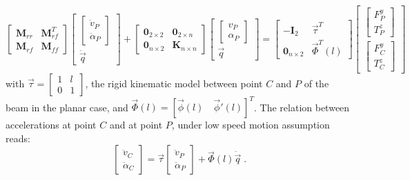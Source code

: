 \documentclass[smallcondensed]{svjour3}     %
\begin{document}
\begin{equation}\label{eq:2nd}
\left[\begin{array}{cc}\mathbf{M}_{rr} & \mathbf{M}_{rf}^T \\\mathbf{M}_{rf} & \mathbf{M}_{ff} \end{array}\right]\left[\begin{array}{c}\left[\begin{array}{c}\ddot{v}_P\\\ddot{\alpha}_P\end{array}\right] \\ \ddot{\vec{q}} \end{array}\right]+\left[\begin{array}{cc}\mathbf{0}_{2\times 2} &  \mathbf{0}_{2\times n}\\ \mathbf{0}_{n\times 2} & \mathbf{K}_{n\times n} \end{array}\right]\left[\begin{array}{c} \left[\begin{array}{c} v_P\\ \alpha_P\end{array}\right] \\ \vec{q} \end{array}\right]=\left[\begin{array}{cc} -\mathbf{I}_2 & \vec{\tau}^T \\\mathbf{0}_{n\times 2} &  \vec{\Phi}^T(l) \end{array}\right]\left[\begin{array}{c}\left[\begin{array}{c} F^y_P \\ T^z_P \end{array}\right] \\ \left[\begin{array}{c} F^y_C\\ T^z_C\end{array}\right] \end{array}\right]
\end{equation}
with $\vec{\tau}=\left[\begin{array}{cc}1 & l\\ 0 & 1 \end{array}\right]$, the rigid  kinematic model between point $C$ and $P$ of the beam in the planar case, and $\vec{\Phi}(l)=[\vec{\phi}(l)\quad \vec{\phi}'(l)]^T$. The relation between accelerations at point $C$ and at point $P$, under low speed motion assumption reads:
\begin{equation}\label{eq:acc1}
\left[\begin{array}{c}\ddot{v}_C\\\ddot{\alpha}_C \end{array}\right]=\vec{\tau}\left[\begin{array}{c}\ddot{v}_P\\\ddot{\alpha}_P \end{array}\right]+\vec{\Phi}(l)\ddot{\vec{q}}\;.
\end{equation}
\end{document}
